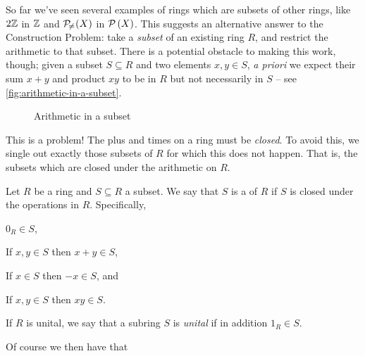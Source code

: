 So far we've seen several examples of rings which are subsets of other rings, like \(2\mathbb{Z}\) in \(\mathbb{Z}\) and \(\mathcal{P}_{\!\neq\!}\left(X\right)\) in \(\mathcal{P}\left(X\right)\). This suggests an alternative answer to the Construction Problem: take a \emph{subset} of an existing ring \(R\), and restrict the arithmetic to that subset. There is a potential obstacle to making this work, though; given a subset \(S \subseteq R\) and two elements \(x,y \in S\), \emph{a priori} we expect their sum \(x+y\) and product \(xy\) to be in \(R\) but not necessarily in \(S\) -- see \autoref{fig:arithmetic-in-a-subset}.
\begin{figure}[h!]
\begin{center}
\caption{Arithmetic in a subset \label{fig:arithmetic-in-a-subset}}
\end{center}
\end{figure}
 This is a problem! The plus and times on a ring must be \emph{closed}. To avoid this, we single out exactly those subsets of \(R\) for which this does not happen. That is, the subsets which are closed under the arithmetic on \(R\).

\begin{dfn}[Subring] \label{dfn:subring}
Let \(R\) be a ring and \(S \subseteq R\) a subset. We say that \(S\) is a  of \(R\) if \(S\) is closed under the operations in \(R\). Specifically,
\begin{proplist*}
\item \(0_R \in S\), \label{dfn:subring:zero}
\item If \(x,y \in S\) then \(x+y \in S\), \label{dfn:subring:plus}
\item If \(x \in S\) then \(-x \in S\), and \label{dfn:subring:neg}
\item If \(x,y \in S\) then \(xy \in S\). \label{dfn:subring:times}
\end{proplist*}
If \(R\) is unital, we say that a subring \(S\) is \emph{unital} if in addition \(1_R \in S\). 
\end{dfn}

Of course we then have that

